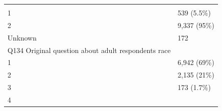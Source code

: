 \documentclass[]{article}
\begin{document}
\begin{longtable}[]{@{}ll@{}}
\begin{minipage}[t]{0.23\columnwidth}
\strut
\end{minipage}\tabularnewline
\begin{minipage}[t]{0.71\columnwidth}\raggedright
1\strut
\end{minipage} & \begin{minipage}[t]{0.23\columnwidth}\raggedright
539 (5.5\%)\strut
\end{minipage}\tabularnewline
\begin{minipage}[t]{0.71\columnwidth}\raggedright
2\strut
\end{minipage} & \begin{minipage}[t]{0.23\columnwidth}\raggedright
9,337 (95\%)\strut
\end{minipage}\tabularnewline
\begin{minipage}[t]{0.71\columnwidth}\raggedright
Unknown\strut
\end{minipage} & \begin{minipage}[t]{0.23\columnwidth}\raggedright
172\strut
\end{minipage}\tabularnewline
\begin{minipage}[t]{0.71\columnwidth}\raggedright
Q134 Original question about adult respondents race\strut
\end{minipage} & \begin{minipage}[t]{0.23\columnwidth}\raggedright
\strut
\end{minipage}\tabularnewline
\begin{minipage}[t]{0.71\columnwidth}\raggedright
1\strut
\end{minipage} & \begin{minipage}[t]{0.23\columnwidth}\raggedright
6,942 (69\%)\strut
\end{minipage}\tabularnewline
\begin{minipage}[t]{0.71\columnwidth}\raggedright
2\strut
\end{minipage} & \begin{minipage}[t]{0.23\columnwidth}\raggedright
2,135 (21\%)\strut
\end{minipage}\tabularnewline
\begin{minipage}[t]{0.71\columnwidth}\raggedright
3\strut
\end{minipage} & \begin{minipage}[t]{0.23\columnwidth}\raggedright
173 (1.7\%)\strut
\end{minipage}\tabularnewline
\begin{minipage}[t]{0.71\columnwidth}\raggedright
4\strut
\end{minipage} & \begin{minipage}[t]{0.23\columnwidth}\raggedright

\end{minipage}
\end{longtable}
\end{document}
